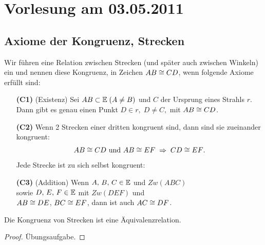 \section*{Vorlesung am 03.05.2011}


\subsection*{Axiome der Kongruenz, Strecken}


Wir f\"{u}hren eine Relation zwischen Strecken (und später auch zwischen Winkeln)
ein und nennen diese \glqq{}Kongruenz\grqq{}, in Zeichen
${AB}\cong{CD}$, wenn
folgende Axiome erf\"{u}llt sind: 


\begin{enumerate}
    \item[{\bf(C1)}] (Existenz) Sei ${AB}\subset\mathbb E\;(A\neq B)$ und
        $C$ der Ursprung eines Strahls $r$. Dann gibt es genau
        einen Punkt $D\in r,\;D\neq C,$ mit
        ${AB}\cong{CD}$.


    \item[{\bf(C2)}] Wenn 2 Strecken einer dritten kongruent sind, dann
    sind sie zueinander kongruent:
    \[{AB}\cong{CD}\mbox{ und }{AB}\cong{EF}
    \;\Rightarrow\;{CD}\cong{EF}.\]
     Jede Strecke ist zu sich selbst kongruent:


    \item[{\bf(C3)}] (Addition) Wenn $A,\,B,\,C\in \mathbb E$ und
    $Zw(ABC)$\\ sowie $D,\,E,\,F\in \mathbb E$ mit $Zw(DEF)$
    und\\
    ${AB}\cong{DE}$, ${BC}\cong{EF}$, dann ist auch
    ${AC}\cong{DF}$.



\end{enumerate}




\begin{thm}\label{thm:satz.s1d}
Die Kongruenz von Strecken ist eine \"{A}quivalenzrelation.
\end{thm}

\begin{proof}
\"{U}bungsaufgabe.
\end{proof}



